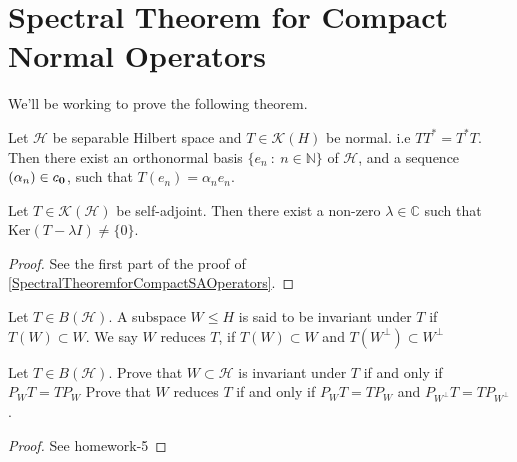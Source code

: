 \section{Spectral Theorem for Compact Normal Operators}
We'll be working to prove the following theorem.
\begin{theorem}
  Let $\mathcal{H}$ be separable Hilbert space and $T\in
  \mathcal{K}(H)$ be normal. i.e
  $TT^* = T^*T$. Then there exist an orthonormal basis $\{ e_n  \ :
  \  n \in \mathbb{N} \}$ of $\mathcal{H}$, and a sequence $(\alpha_n) \in
  c_{\bf 0}$, such that $T(e_n) = \alpha_n e_n$.
\end{theorem}

\begin{lemma}
  Let $T \in \mathcal{K}(\mathcal{H})$ be self-adjoint. Then there
  exist a non-zero $\lambda \in \mathbb{C}$ such that $
  \textrm{Ker}(T - \lambda I) \neq \{ 0 \}$.
\end{lemma}
\begin{proof}
  See the first part of the proof of
  \autoref{SpectralTheoremforCompactSAOperators}.
\end{proof}

\begin{definition}
  Let $T \in B(\mathcal{H})$. A subspace $W \leqslant H$ is said to be
  invariant under $T$ if $T(W) \subset W$. We say $W$ reduces $T$, if
  $T(W) \subset W$ and $T(W^\perp) \subset W^\perp$
\end{definition}

\begin{example}
  Let $T \in B(\mathcal{H})$.
  Prove that $W \subset \mathcal{H}$ is invariant under $T$ if and
  only if $P_WT = TP_W$
  Prove that $W$ reduces $T$ if and only if $P_WT = TP_W$ and
  $P_{W^\perp}T = T P_{W^\perp}$.
\end{example}
\begin{proof}
  See homework-5
\end{proof}

